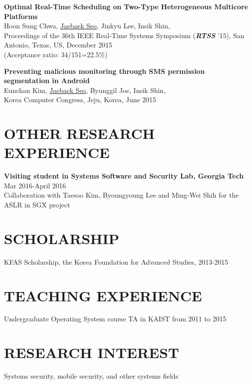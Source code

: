 \documentclass{res}
\begin{document}
\begin{resume}
    \textbf{Optimal Real-Time Scheduling on Two-Type Heterogeneous Multicore Platforms}\\
    Hoon Sung Chwa, \underline{Jaebaek Seo}, Jinkyu Lee, Insik Shin,\\
    Proceedings of the 36th IEEE Real-Time Systems Symposium (\emph{\textbf{RTSS}} '15),
    San Antonio, Texas, US, December 2015\\
    {\small(Acceptance ratio: 34/151=22.5\%)}

    \textbf{Preventing malicious monitoring through SMS permission segmentation in Android}\\
    Eunchan Kim, \underline{Jaebaek Seo}, Byunggil Joe, Insik Shin,\\
    Korea Computer Congress, Jeju, Korea, June 2015

\section{OTHER RESEARCH EXPERIENCE}
   \vspace{0.1in}
    \textbf{Visiting student in Systems Software and Security Lab, Georgia Tech}\\
    Mar 2016-April 2016\\
    Collaboration with Taesoo Kim, Byoungyoung Lee and Ming-Wei Shih for the ASLR in SGX project

\section{SCHOLARSHIP}
   KFAS Scholarship, the Korea Foundation for Advanced Studies, 2013-2015

\section{TEACHING EXPERIENCE}
    Undergraduate Operating System course TA in KAIST from 2011 to 2015

\section{RESEARCH INTEREST}
    Systems security, mobile security, and other systems fields


\end{resume}
\end{document}
